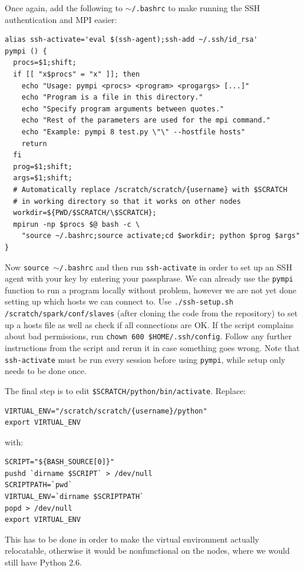\documentclass{article}
\begin{document}
Once again, add the following to \texttt{$\sim$/.bashrc} to make running the 
SSH authentication and MPI easier:

\begin{verbatim}
alias ssh-activate='eval $(ssh-agent);ssh-add ~/.ssh/id_rsa'
pympi () {
  procs=$1;shift;
  if [[ "x$procs" = "x" ]]; then
    echo "Usage: pympi <procs> <program> <progargs> [...]"
    echo "Program is a file in this directory."
    echo "Specify program arguments between quotes."
    echo "Rest of the parameters are used for the mpi command."
    echo "Example: pympi 8 test.py \"\" --hostfile hosts"
    return
  fi
  prog=$1;shift;
  args=$1;shift;
  # Automatically replace /scratch/scratch/{username} with $SCRATCH
  # in working directory so that it works on other nodes
  workdir=${PWD/$SCRATCH/\$SCRATCH};
  mpirun -np $procs $@ bash -c \
    "source ~/.bashrc;source activate;cd $workdir; python $prog $args"
}
\end{verbatim}

Now \texttt{source $\sim$/.bashrc} and then run \texttt{ssh-activate} in order 
to set up an SSH agent with your key by entering your passphrase. We can 
already use the \texttt{pympi} function to run a program locally without 
problem, however we are not yet done setting up which hosts we can connect to. 
Use \texttt{./ssh-setup.sh /scratch/spark/conf/slaves} (after cloning the code 
from the repository) to set up a hosts file as well as check if all connections 
are OK\@. If the script complains about bad permissions, run \texttt{chown 600 
\$HOME/.ssh/config}. Follow any further instructions from the script and rerun 
it in case something goes wrong. Note that \texttt{ssh-activate} must be run 
every session before using \texttt{pympi}, while setup only needs to be done 
once.

The final step is to edit \texttt{\$SCRATCH/python/bin/activate}. Replace:

\begin{verbatim}
VIRTUAL_ENV="/scratch/scratch/{username}/python"
export VIRTUAL_ENV
\end{verbatim}

with:

\begin{verbatim}
SCRIPT="${BASH_SOURCE[0]}"
pushd `dirname $SCRIPT` > /dev/null
SCRIPTPATH=`pwd`
VIRTUAL_ENV=`dirname $SCRIPTPATH`
popd > /dev/null
export VIRTUAL_ENV
\end{verbatim}

This has to be done in order to make the virtual environment actually 
relocatable, otherwise it would be nonfunctional on the nodes, where we would 
still have Python 2.6.
\end{document}
